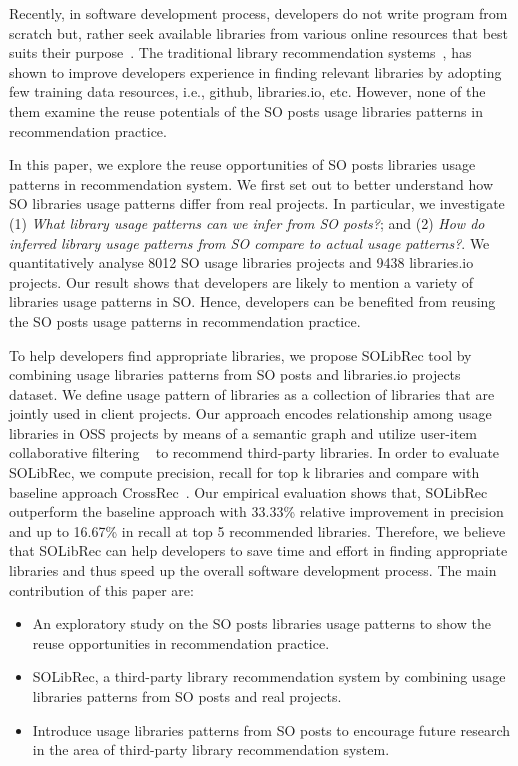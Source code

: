 \documentclass[paper]{ieice}
\newcommand{\PSOne}{\textit{What library usage patterns can we infer from SO posts?}}
\newcommand{\PSTwo}{\textit{How do inferred library usage patterns from SO compare to actual usage patterns?}}
\begin{document}
Recently, in software development process, developers do not write program from scratch but, rather seek available libraries from various online resources that best suits their purpose~\cite{nguyen2020crossrec}. The traditional library recommendation systems~\cite{nguyen2020crossrec, saied2018improving, thung2013automated, ouni2017search}, has shown to improve developers experience in finding relevant libraries by adopting few training data resources, i.e., github, libraries.io, etc. However, none of the them examine the reuse potentials of the SO posts usage libraries patterns in recommendation practice. 

In this paper, we explore the reuse opportunities of SO posts libraries usage patterns in recommendation system. We first set out to better understand how SO libraries usage patterns differ from real projects. In particular, we investigate (1) \PSOne; and (2) \PSTwo. We quantitatively analyse 8012 SO usage libraries projects and 9438 libraries.io projects. Our result shows that developers are likely to mention a variety of libraries usage patterns in SO. Hence, developers can be benefited from reusing the SO posts usage patterns in recommendation practice. 

To help developers find appropriate libraries, we propose SOLibRec tool by combining usage libraries patterns from SO posts and libraries.io projects dataset. We define usage pattern of libraries as a collection of libraries that are jointly used in client projects. Our approach encodes relationship among usage libraries in OSS projects by means of a semantic graph and utilize user-item collaborative filtering ~\cite{schafer2007collaborative} to recommend third-party libraries. In order to  evaluate SOLibRec, we compute precision, recall for top k libraries and compare with baseline approach CrossRec~\cite{nguyen2020crossrec}. Our empirical evaluation shows that, SOLibRec outperform the baseline approach with 33.33\% relative improvement in precision and up to 16.67\% in recall at top 5 recommended libraries. Therefore, we believe that SOLibRec can help developers to save time and effort in finding appropriate libraries and thus speed up the overall software development process.
The main contribution of this paper are:
\begin{itemize}
    \item An exploratory study on the SO posts libraries usage patterns to show the reuse opportunities in recommendation practice.
    \item SOLibRec, a third-party library recommendation system by combining usage libraries patterns from SO posts and real projects.
    \item Introduce usage libraries patterns from SO posts to encourage future research in the area of third-party library recommendation system.
\end{itemize}
\end{document}
